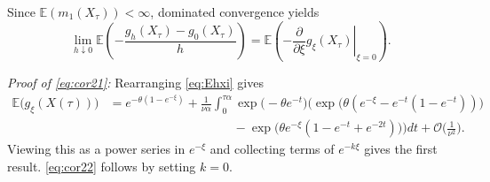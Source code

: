 \documentclass{imsart}
\theoremstyle{plain}
\theoremstyle{definition}
\begin{document}
Since $\mathbb E(m_1(X_\tau))<\infty$, dominated convergence yields
$$
\lim_{h\downarrow0}
\mathbb E\left(
-\frac{g_h(X_\tau)-g_0(X_\tau)}{h}
\right)
=
\mathbb E\left(
-\left.\frac{\partial}{\partial\xi}g_\xi(X_\tau)\right|_{\xi=0}
\right).
$$

\noindent\emph{Proof of \eqref{eq:cor21}:}
Rearranging \eqref{eq:Ehxi} gives
\begin{align*}
    \mathbb E\big(g_\xi(X(\tau))\big) & = e^{-\theta(1 - e^{-\xi})} + \frac 1{\nu \alpha} \int_0^{\tau\alpha} \exp\Big(-\theta e^{-t}\Big) \Big(  \exp\Big(\theta(e^{-\xi} - e^{-t}(1 - e^{-t}))\Big)  \\ & \qquad \qquad \qquad \qquad \qquad - \exp\Big(\theta e^{-\xi}(1 - e^{-t} + e^{-2t})\Big)\Big)dt + \mathcal O\Big(\frac{1}{\nu^2}\Big).
\end{align*}
Viewing this as a power series in $e^{-\xi}$ and collecting terms of $e^{- k \xi}$ gives the first result. \eqref{eq:cor22} follows by setting $k=0$.
\end{document}
